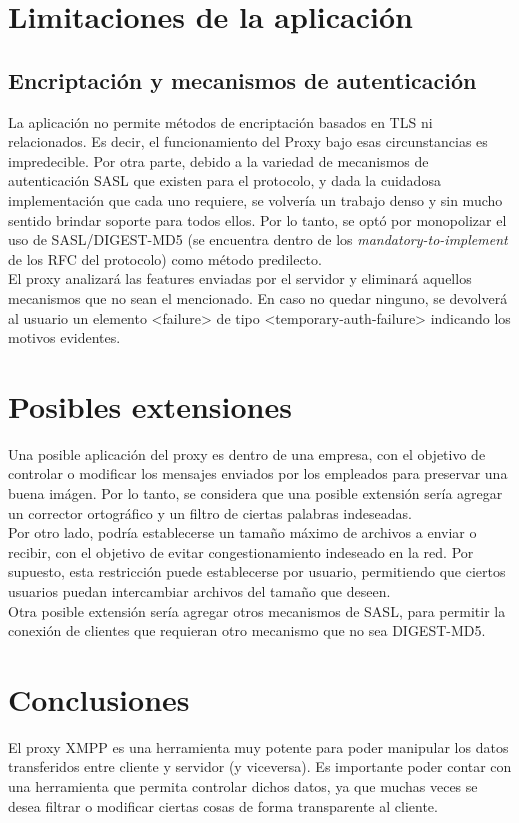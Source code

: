 \documentclass[a4paper,10pt]{article}
\begin{document}
\section{Limitaciones de la aplicación}
\subsection{Encriptación y mecanismos de autenticación}
La aplicación no permite métodos de encriptación basados en TLS ni  relacionados.
Es decir, el funcionamiento del Proxy bajo esas circunstancias es impredecible.
Por otra parte, debido a la variedad de mecanismos de autenticación SASL que
existen para el protocolo, y dada la cuidadosa implementación que cada uno
requiere, se volvería un trabajo denso y sin mucho sentido brindar soporte para
todos ellos. Por lo tanto, se optó por monopolizar el uso de SASL/DIGEST-MD5
(se encuentra dentro de los \textit{mandatory-to-implement} de los RFC del
protocolo) como método predilecto.\\
El proxy analizará las features enviadas por el servidor y eliminará
aquellos mecanismos que no sean el mencionado. En caso no quedar ninguno, se
devolverá al usuario un elemento <failure> de tipo <temporary-auth-failure>
indicando los motivos evidentes.


\section{Posibles extensiones}
Una posible aplicación del proxy es dentro de una empresa, con el objetivo de controlar o modificar
los mensajes enviados por los empleados para preservar una buena imágen. Por lo tanto, se considera
que una posible extensión sería agregar un corrector ortográfico y un filtro de ciertas palabras
indeseadas.\\
Por otro lado, podría establecerse un tamaño máximo de archivos a enviar o recibir, con el objetivo
de evitar congestionamiento indeseado en la red. Por supuesto, esta restricción puede establecerse
por usuario, permitiendo que ciertos usuarios puedan intercambiar archivos del tamaño que deseen.\\
Otra posible extensión sería agregar otros mecanismos de SASL, para permitir la conexión de clientes
que requieran otro mecanismo que no sea DIGEST-MD5.

\section{Conclusiones}
El proxy XMPP es una herramienta muy potente para poder manipular los datos transferidos entre cliente y servidor 
(y viceversa). Es importante poder contar con una herramienta que permita controlar dichos datos, ya que muchas
veces se desea filtrar o modificar ciertas cosas de forma transparente al cliente.
\end{document}
